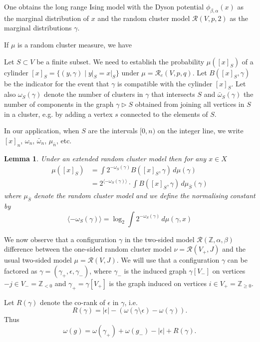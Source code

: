 \documentclass[11pt, a4paper]{amsart}
\newtheorem{lem}[thm]{Lemma}
\theoremstyle{definition}
\theoremstyle{remark}
\renewcommand{\d}{\,d}
\providecommand{\ZZ}{\mathbb{Z}}
\providecommand{\mscr}{\mathscr}
\providecommand{\e}{\epsilon}
\providecommand{\g}{\gamma}
\providecommand{\w}{\omega}
\def\X{X}
\begin{document}
One obtains the long range Ising model with the Dyson potential $\phi_{\beta,\alpha}(x)$ as
the marginal distribution of $x$ and the random cluster model $\mscr R(V,p,2)$
as the marginal distributions $\g$.

If $\mu$ is a random cluster measure, we have 

\def\cc#1{{\langle #1 \rangle}}

Let $S\subset V$ be a finite subset.
We need to establish the probability $\mu([x]_S)$ of a cylinder 
$[x]_S=\{(y,\g) \mid y\vert_S = x\vert_S\}$ under $\mu=\mscr R_e(V,p,q)$.
Let $B([x]_S,\g)$ be the indicator for the event that $\g$ is compatible with 
the cylinder $[x]_S$. Let also $\w_S(\g)$ denote the number of clusters in $\gamma$ that intersects $S$ and $\bar\w_S(\g)$ the number of components in the graph $\g\triangleright S$
obtained from joining all 
vertices in $S$ in a cluster, e.g. by adding a vertex $s$ connected to the elements of $S$.

In our application, when $S$ are the intervals $[0,n)$ on the integer line,
we write $[x]_n$, $\w_n$, $\bar\w_n$, $\mu_{\bar n}$, etc. 

\begin{lem}\label{lem:probcyl}
  Under an extended random cluster model then for any $x\in\X$
\begin{align}
    \mu([x]_S) &=  \int 2^{-\w_S(\g)} B([x]_S,\g) \d\mu(\g) \\
    &= 2^\cc{-\w_S(\g)} \cdot \int B([x]_S,\g) \d \mu_{\bar S}(\g)  
\end{align}
where $\mu_{\bar S}$ denote the random cluster model and we define the normalising
constant by
$$ \cc{-\w_S(\g)} = \log_2 \int 2^{-\w_S(\g)} \d\mu(\g,x) $$
\end{lem}


We now observe that a configuration $\g$ in the two-sided model
$\mscr R(\ZZ,\alpha,\beta)$ difference between the one-sided random cluster model
$\nu = \mscr R(V_+,J)$ and the usual two-sided model $\mu = \mscr R(V,J)$. We will
use that a configuration $\g$ can be factored as $\g = (\g_+, \e, \g_-)$, where
$\g_-$ is the induced graph $\g[V_-]$ on vertices $-j\in V_-=\ZZ_{<0}$ and
$\g_+=\g[V_+]$ is the graph induced on vertices $i\in V_+=\ZZ_{\ge0}$.

Let $R(\g)$ denote the co-rank of $\e$ in $\g$, i.e.\
\begin{equation}\label{eq:Rdef}
R(\g)=|\epsilon|-(\omega(\g \setminus \epsilon)-\omega(\g)).
\end{equation}
Thus
$$ \w(g) = \w(\g_+) + \w(g_-) - |\e| + R(\g). $$
\end{document}
